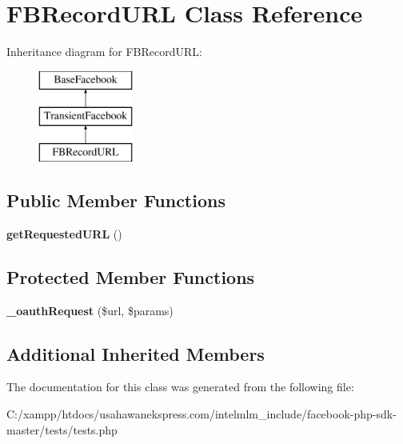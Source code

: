 \hypertarget{class_f_b_record_u_r_l}{\section{F\-B\-Record\-U\-R\-L Class Reference}
\label{class_f_b_record_u_r_l}
}
Inheritance diagram for F\-B\-Record\-U\-R\-L\-:\begin{figure}[H]
\begin{center}
\leavevmode
\includegraphics[height=3.000000cm]{class_f_b_record_u_r_l}
\end{center}
\end{figure}
\subsection*{Public Member Functions}
\begin{DoxyCompactItemize}
\item 
\hypertarget{class_f_b_record_u_r_l_a6d3d4cd9a93c5389b3a1c24c474238fc}{{\bfseries get\-Requested\-U\-R\-L} ()}\label{class_f_b_record_u_r_l_a6d3d4cd9a93c5389b3a1c24c474238fc}

\end{DoxyCompactItemize}
\subsection*{Protected Member Functions}
\begin{DoxyCompactItemize}
\item 
\hypertarget{class_f_b_record_u_r_l_a1e520893c45507103d5722f6e98b5855}{{\bfseries \-\_\-oauth\-Request} (\$url, \$params)}\label{class_f_b_record_u_r_l_a1e520893c45507103d5722f6e98b5855}

\end{DoxyCompactItemize}
\subsection*{Additional Inherited Members}


The documentation for this class was generated from the following file\-:\begin{DoxyCompactItemize}
\item 
C\-:/xampp/htdocs/usahawanekspress.\-com/intelmlm\-\_\-include/facebook-\/php-\/sdk-\/master/tests/tests.\-php\end{DoxyCompactItemize}
